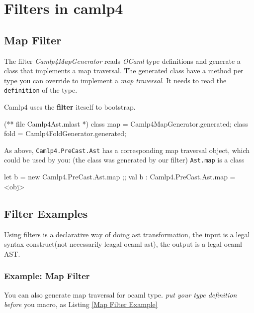 \section{Filters in camlp4}


\subsection{Map Filter}
\label{transform}


The filter \emph{Camlp4MapGenerator} reads \emph{OCaml} type
definitions and generate a class that implements a map traversal.  The
generated class have a method per type you can override to implement a
\emph{map traversal}. It needs to read the \verb|definition| of the
type.

Camlp4 uses the \textbf{ filter} iteself to bootstrap.


\begin{ocamlcode}
(** file Camlp4Ast.mlast *)
class map = Camlp4MapGenerator.generated;
class fold = Camlp4FoldGenerator.generated;
\end{ocamlcode}

As above, \verb|Camlp4.PreCast.Ast| has a corresponding map traversal
object, which could be used by you: (the class was generated by our
filter) \verb|Ast.map| is a class

\begin{ocamlcode}
let b = new Camlp4.PreCast.Ast.map ;;
val b : Camlp4.PreCast.Ast.map = <obj>
\end{ocamlcode}



\subsection{Filter Examples}
Using filters is a declarative way of doing ast transformation, the
input is a legal syntax construct(not necessarily leagal ocaml ast),
the output is a legal ocaml AST.

\subsubsection{Example: Map Filter}
You can also generate map traversal for ocaml type. \textit{put your
  type definition before} you macro, as Listing \ref{Map Filter
  Example}

\inputminted[fontsize=\scriptsize,bgcolor=lightlightgray]
{ocaml}{code/camlp4/filters/ast_map/ast_map.ml}

